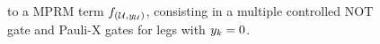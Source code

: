 \begin{figure}
    \begin{center}
        
    \end{center}
    \caption{
        \ComputationCircuit{} to a MPRM term $f_{(\mathcal{U},y_{\mathcal{U}})}$, consisting in a multiple controlled $\mathrm{NOT}$ gate and Pauli-X gates for legs with $y_{k}=0$.
    }\label{fig:qcbencodingPolynomial}
\end{figure}


